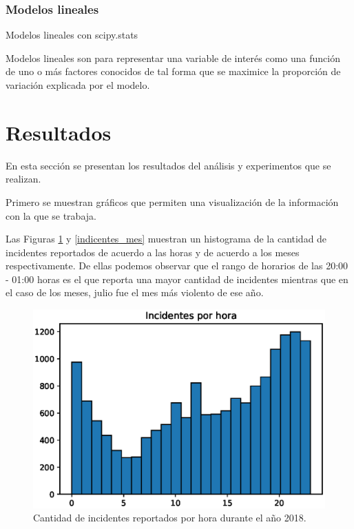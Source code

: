 \documentclass[final,5p,times]{elsarticle}
\begin{document}
\subsubsection*{Modelos lineales}

Modelos lineales con scipy.stats

Modelos lineales son para representar una variable de interés como una función de uno o más factores conocidos de tal forma que se maximice la proporción de variación explicada por el modelo.



\section{Resultados} \label{resultados}

En esta secci\'on se presentan los resultados del an\'alisis y experimentos que se realizan.

Primero se muestran gr\'aficos que permiten una visualizaci\'on de la informaci\'on con la que se trabaja. 

Las Figuras \ref{incidentes_horas} y \ref{indicentes_mes} muestran un histograma de la cantidad de incidentes reportados de acuerdo a las horas y de acuerdo a los meses respectivamente. De ellas podemos observar que el rango de horarios de las 20:00 - 01:00 horas es el que reporta una mayor cantidad de incidentes mientras que en el caso de los meses, julio fue el mes m\'as violento de ese a\~no.

\begin{figure}
\centering
\includegraphics[scale=0.6]{horas.eps}
\caption{Cantidad de incidentes reportados por hora durante el a\~no 2018.}
\label{incidentes_horas}
\end{figure} 
\end{document}
